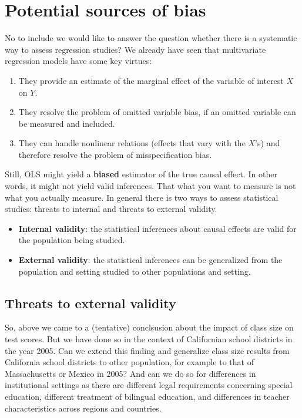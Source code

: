 \documentclass[
]{book}
\providecommand{\tightlist}{%
  \setlength{\itemsep}{0pt}\setlength{\parskip}{0pt}}
\begin{document}
\hypertarget{sec:sourcesbias}{%
\section{Potential sources of bias}\label{sec:sourcesbias}}

No to include we would like to answer the question whether there is a systematic way to assess regression studies? We already have seen that multivariate regression models have some key virtues:

\begin{enumerate}
\def\labelenumi{\arabic{enumi}.}
\tightlist
\item
  They provide an estimate of the marginal effect of the variable of interest \(X\) on \(Y\).
\item
  They resolve the problem of omitted variable bias, if an omitted variable can be measured and included.
\item
  They can handle nonlinear relations (effects that vary with the \(X\)'s) and therefore resolve the problem of misspecification bias.
\end{enumerate}

Still, OLS might yield a \textbf{biased} estimator of the true causal effect. In other words, it might not yield valid inferences. That what you want to measure is not what you actually measure. In general there is two ways to assess statistical studies: threats to internal and threats to external validity.

\begin{itemize}
\tightlist
\item
  \textbf{Internal validity}: the statistical inferences about causal effects are valid for the population being studied.
\item
  \textbf{External validity}: the statistical inferences can be generalized from the population and setting studied to other populations and setting.
\end{itemize}

\hypertarget{threats-to-external-validity}{%
\subsection{Threats to external validity}\label{threats-to-external-validity}}

So, above we came to a (tentative) conclsusion about the impact of class size on test scores. But we have done so in the context of Californian school districts in the year 2005. Can we extend this finding and generalize class size results from California school districts to other population, for example to that of Massachusetts or Mexico in 2005? And can we do so for differences in institutional settings as there are different legal requirements concerning special education, different treatment of bilingual education, and differences in teacher characteristics across regions and countries.
\end{document}

